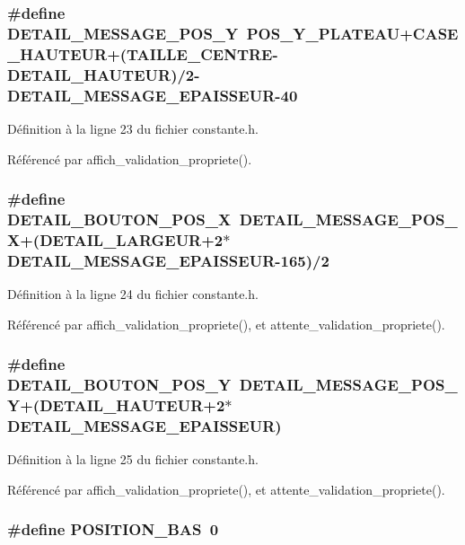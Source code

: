 \subsubsection{\setlength{\rightskip}{0pt plus 5cm}\#define DETAIL\_\-MESSAGE\_\-POS\_\-Y~POS\_\-Y\_\-PLATEAU+CASE\_\-HAUTEUR+(TAILLE\_\-CENTRE-DETAIL\_\-HAUTEUR)/2-DETAIL\_\-MESSAGE\_\-EPAISSEUR-40}\label{constante_8h_be07a7821d090b3adc8cc49139f187a3}




D\'{e}finition \`{a} la ligne 23 du fichier constante.h.

R\'{e}f\'{e}renc\'{e} par affich\_\-validation\_\-propriete().
\subsubsection{\setlength{\rightskip}{0pt plus 5cm}\#define DETAIL\_\-BOUTON\_\-POS\_\-X~DETAIL\_\-MESSAGE\_\-POS\_\-X+(DETAIL\_\-LARGEUR+2$\ast$DETAIL\_\-MESSAGE\_\-EPAISSEUR-165)/2}\label{constante_8h_e8a0aac2acf19fcccb9db22c1c0058b5}




D\'{e}finition \`{a} la ligne 24 du fichier constante.h.

R\'{e}f\'{e}renc\'{e} par affich\_\-validation\_\-propriete(), et attente\_\-validation\_\-propriete().
\subsubsection{\setlength{\rightskip}{0pt plus 5cm}\#define DETAIL\_\-BOUTON\_\-POS\_\-Y~DETAIL\_\-MESSAGE\_\-POS\_\-Y+(DETAIL\_\-HAUTEUR+2$\ast$DETAIL\_\-MESSAGE\_\-EPAISSEUR)}\label{constante_8h_31536149faec8def7a49491c9e290509}




D\'{e}finition \`{a} la ligne 25 du fichier constante.h.

R\'{e}f\'{e}renc\'{e} par affich\_\-validation\_\-propriete(), et attente\_\-validation\_\-propriete().
\subsubsection{\setlength{\rightskip}{0pt plus 5cm}\#define POSITION\_\-BAS~0}\label{constante_8h_64b81826e3ea3ee7cb7ca375f89cab09}




